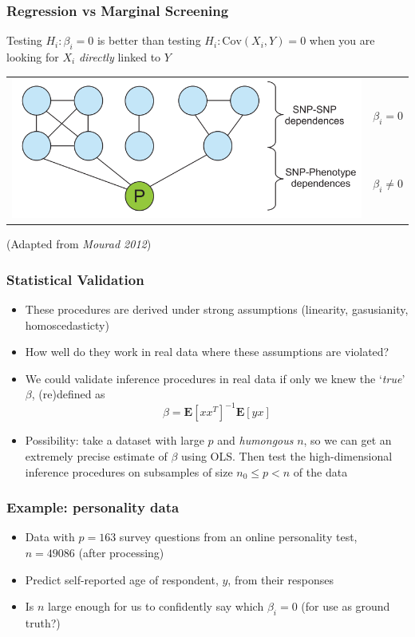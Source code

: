 \documentclass{beamer}
\newcommand{\E}{\textbf{E}}
\newcommand{\Cov}{\text{Cov}}
\begin{document}
\begin{frame}
\frametitle{Regression vs Marginal Screening}
Testing $H_i: \beta_i = 0$ is better than testing $H_i: \Cov(X_i, Y) = 0$
when you are looking for $X_i$ \emph{directly} linked to $Y$
\begin{center}
\begin{tabular}{cc}
\multirow{5}{*}{\includegraphics[scale = 0.3]{pgm.png}} & \\
& $\beta_i = 0$\\
& \vspace{0.2in}\\
& $\beta_i \neq 0$\\
& \vspace{0.2in}\\
\end{tabular}
\end{center}
(Adapted from \emph{Mourad 2012})
\end{frame}

\begin{frame}
\frametitle{Statistical Validation}
\begin{itemize}
\item<1-> These procedures are derived under strong assumptions (linearity, gasusianity, homoscedasticty)
\item<1-> How well do they work in real data where these assumptions are violated?
\item<1-> We could validate inference procedures in real data if only we knew the `\emph{true}' $\beta$, (re)defined as
\[
\beta = \E[x x^T]^{-1} \E[yx]
\]
\item<2-> Possibility: take a dataset with large $p$ and
  \emph{humongous} $n$, so we can get an extremely precise estimate of
  $\beta$ using OLS. Then test the high-dimensional inference
  procedures on subsamples of size $n_0 \leq p < n$ of the data
\end{itemize}
\end{frame}

\begin{frame}
\frametitle{Example: personality data}
\begin{itemize}
\item Data with $p = 163$ survey questions from an online personality test, $n = 49086$ (after processing)
\item Predict self-reported age of respondent, $y$, from their responses
\item Is $n$ large enough for us to confidently say which $\beta_i = 0$ (for use as ground truth?)
\end{itemize}
\end{frame}
\end{document}
